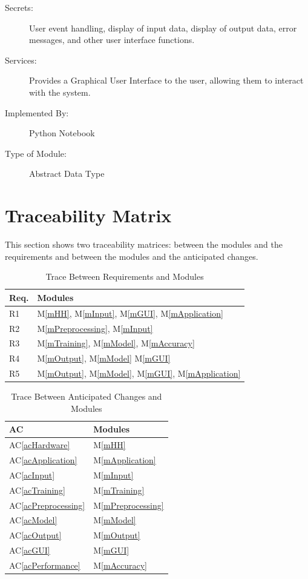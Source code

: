 \documentclass[12pt, titlepage]{article}
\newcommand{\acref}[1]{AC\ref{#1}}
\newcommand{\mref}[1]{M\ref{#1}}
\begin{document}
\begin{description}
\item[Secrets:] User event handling, display of input data, display of output
data, error messages, and other user interface functions.
\item[Services:] Provides a Graphical User Interface to the user, allowing them
to interact with the system.
\item[Implemented By:] Python Notebook
\item[Type of Module:] Abstract Data Type
\end{description}

\section{Traceability Matrix} \label{SecTM}

This section shows two traceability matrices: between the modules and the
requirements and between the modules and the anticipated changes.

\begin{table}[H]
\centering
\begin{tabular}{p{} p{}}
\toprule
\textbf{Req.} & \textbf{Modules}\\
\midrule
R1 & \mref{mHH}, \mref{mInput}, \mref{mGUI}, \mref{mApplication}\\
R2 & \mref{mPreprocessing}, \mref{mInput}\\
R3 & \mref{mTraining}, \mref{mModel}, \mref{mAccuracy}\\
R4 & \mref{mOutput}, \mref{mModel} \mref{mGUI}\\
R5 & \mref{mOutput}, \mref{mModel}, \mref{mGUI}, \mref{mApplication}\\
\bottomrule
\end{tabular}
\caption{Trace Between Requirements and Modules}
\label{TblRT}
\end{table}

\begin{table}[H]
\centering
\begin{tabular}{p{} p{}}
\toprule
\textbf{AC} & \textbf{Modules}\\
\midrule
\acref{acHardware} & \mref{mHH}\\
\acref{acApplication} & \mref{mApplication}\\
\acref{acInput} & \mref{mInput}\\
\acref{acTraining} & \mref{mTraining}\\
\acref{acPreprocessing} & \mref{mPreprocessing}\\
\acref{acModel} & \mref{mModel}\\
\acref{acOutput} & \mref{mOutput}\\
\acref{acGUI} & \mref{mGUI}\\
\acref{acPerformance} & \mref{mAccuracy}\\
\bottomrule
\end{tabular}
\caption{Trace Between Anticipated Changes and Modules}
\label{TblACT}
\end{table}
\end{document}
